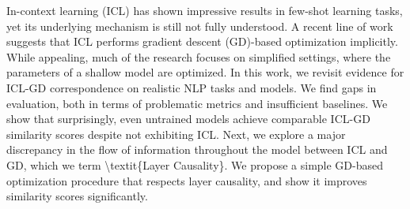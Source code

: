 In-context learning (ICL) has shown impressive results in few-shot learning tasks, yet its underlying mechanism is still not fully understood. A recent line of work suggests that ICL performs gradient descent (GD)-based optimization implicitly. While appealing, much of the research focuses on simplified settings, where the parameters of a shallow model are optimized. In this work, we revisit evidence for ICL-GD correspondence on realistic NLP tasks and models.  We find gaps in evaluation, both in terms of problematic metrics and insufficient baselines. We show that surprisingly, even untrained models achieve comparable ICL-GD similarity scores despite not exhibiting ICL. Next, we explore a major discrepancy in the flow of information throughout the model between ICL and GD, which we term \textbackslash{}textit\{Layer Causality\}. We propose a simple GD-based optimization procedure that respects layer causality, and show it improves similarity scores significantly.
